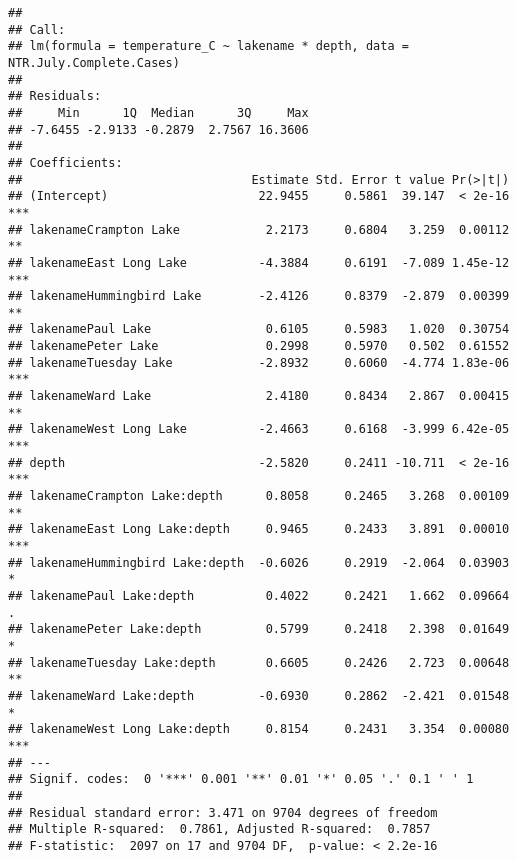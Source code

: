 \documentclass[]{article}
\newenvironment{Shaded}{\begin{snugshade}}{\end{snugshade}}
\newcommand{\CommentTok}[1]{\textcolor[rgb]{0.56,0.35,0.01}{\textit{#1}}}
\newcommand{\DataTypeTok}[1]{\textcolor[rgb]{0.13,0.29,0.53}{#1}}
\newcommand{\KeywordTok}[1]{\textcolor[rgb]{0.13,0.29,0.53}{\textbf{#1}}}
\newcommand{\NormalTok}[1]{#1}
\newcommand{\OperatorTok}[1]{\textcolor[rgb]{0.81,0.36,0.00}{\textbf{#1}}}
\newcommand{\StringTok}[1]{\textcolor[rgb]{0.31,0.60,0.02}{#1}}
\begin{document}
\begin{Shaded}
\end{Shaded}

\begin{verbatim}
## 
## Call:
## lm(formula = temperature_C ~ lakename * depth, data = NTR.July.Complete.Cases)
## 
## Residuals:
##     Min      1Q  Median      3Q     Max 
## -7.6455 -2.9133 -0.2879  2.7567 16.3606 
## 
## Coefficients:
##                                Estimate Std. Error t value Pr(>|t|)    
## (Intercept)                     22.9455     0.5861  39.147  < 2e-16 ***
## lakenameCrampton Lake            2.2173     0.6804   3.259  0.00112 ** 
## lakenameEast Long Lake          -4.3884     0.6191  -7.089 1.45e-12 ***
## lakenameHummingbird Lake        -2.4126     0.8379  -2.879  0.00399 ** 
## lakenamePaul Lake                0.6105     0.5983   1.020  0.30754    
## lakenamePeter Lake               0.2998     0.5970   0.502  0.61552    
## lakenameTuesday Lake            -2.8932     0.6060  -4.774 1.83e-06 ***
## lakenameWard Lake                2.4180     0.8434   2.867  0.00415 ** 
## lakenameWest Long Lake          -2.4663     0.6168  -3.999 6.42e-05 ***
## depth                           -2.5820     0.2411 -10.711  < 2e-16 ***
## lakenameCrampton Lake:depth      0.8058     0.2465   3.268  0.00109 ** 
## lakenameEast Long Lake:depth     0.9465     0.2433   3.891  0.00010 ***
## lakenameHummingbird Lake:depth  -0.6026     0.2919  -2.064  0.03903 *  
## lakenamePaul Lake:depth          0.4022     0.2421   1.662  0.09664 .  
## lakenamePeter Lake:depth         0.5799     0.2418   2.398  0.01649 *  
## lakenameTuesday Lake:depth       0.6605     0.2426   2.723  0.00648 ** 
## lakenameWard Lake:depth         -0.6930     0.2862  -2.421  0.01548 *  
## lakenameWest Long Lake:depth     0.8154     0.2431   3.354  0.00080 ***
## ---
## Signif. codes:  0 '***' 0.001 '**' 0.01 '*' 0.05 '.' 0.1 ' ' 1
## 
## Residual standard error: 3.471 on 9704 degrees of freedom
## Multiple R-squared:  0.7861, Adjusted R-squared:  0.7857 
## F-statistic:  2097 on 17 and 9704 DF,  p-value: < 2.2e-16
\end{verbatim}
\end{document}
